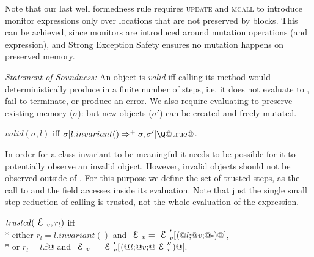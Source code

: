 
Note that our last well formedness rule requires 
\textsc{update} and \textsc{mcall} to introduce
monitor expressions only over locations
that are not preserved by \Q@try@ blocks.
This can be achieved, since monitors are introduced
around mutation operations
(and \Q@new@ expression),
and Strong Exception Safety ensures no mutation happens on preserved memory.


\loseSpace
\noindent\textit{Statement of Soundness:}
An object is \emph{valid} iff calling its \Q@invariant@ method would
deterministically produce \Q@true@ in a finite number of steps, i.e. it does not evaluate to \Q@false@, fail to terminate, or produce an error.
We also require evaluating \Q@invariant@ to preserve existing memory ($\sigma$): but new objects ($\sigma'$) can be created and freely mutated.

\indent$valid(\sigma,l)$ iff $\sigma | l.invariant()\Rightarrow^+ \sigma,\sigma' | \text{\Q@true@}$.\loseSpace

\noindent In order for a class invariant to be meaningful it needs to be possible for it to potentially observe an invalid object. However, invalid objects should not be observed outside of \@@invariant@.
For this purpose we define the set of trusted steps, 
as the call to \Q@invariant@ and the field accesses inside its evaluation.
Note that just the single small step reduction
of calling \Q@invariant@ is trusted, not the whole evaluation of the \Q@invariant@ expression.

\loseSpace
\noindent $\mathit{trusted}(\ctx_v,r_l)$ iff\\*
\indent either
$r_l=l.invariant()$ and
 $\ctx_v=\ctx_v'[$\Q@M(@$l$\Q@;@$v$\Q@;@$\square$\Q@)@$]$,\\*
\indent or
$r_l=l$\Q@.f@ and
 $\ctx_v=\ctx_v'[$\Q@M(@$l$\Q@;@$v$\Q@;@$\ctx_v''$\Q@)@$]$.
\loseSpace

